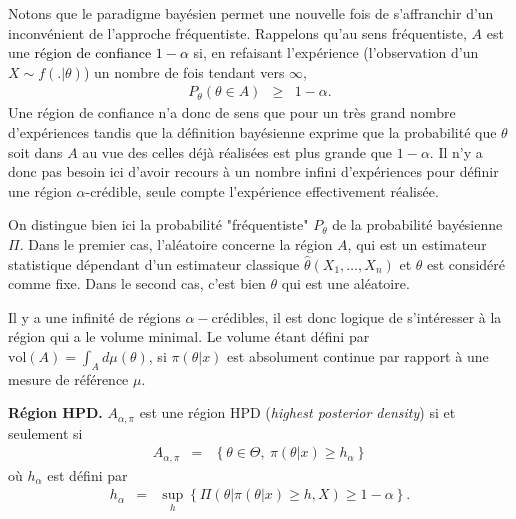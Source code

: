 Notons que le paradigme bayésien permet une nouvelle fois de s’affranchir d’un inconvénient de l’approche fréquentiste.
Rappelons qu'au sens fréquentiste, $A$ est une \textcolor{black}{région de confiance $1-\alpha$} si, en refaisant l'expérience (l'observation d'un $X\sim f(.|\theta)$) un nombre de fois tendant vers $\infty$,
\begin{eqnarray*}
P_{\theta}(\theta\in A) & \geq & 1-\alpha.
\end{eqnarray*}
Une région de confiance n’a donc de sens que pour un très grand nombre d’expériences tandis que la définition bayésienne exprime que la probabilité que $\theta$ soit dans $A$ au vue des celles déjà réalisées est plus grande que $1-\alpha$. Il n’y a donc pas besoin ici d’avoir recours à un nombre infini d’expériences pour définir une région $\alpha$-crédible, seule compte l’expérience effectivement réalisée. \\
 
 



\begin{remark}
On distingue bien ici la probabilité "fréquentiste" $P_{\theta}$ de la probabilité bayésienne $\Pi$. Dans le premier cas, l'aléatoire concerne la région $A$, qui est un estimateur statistique dépendant d'un estimateur classique $\hat\theta(X_1,\ldots,X_n)$ et $\theta$ est considéré comme fixe. Dans le second cas, c'est bien $\theta$ qui est une aléatoire.
\end{remark}

Il y a une infinité de régions $\alpha-$crédibles, il est donc logique de s’intéresser
à la région qui a le volume minimal. Le volume étant défini par $\mbox{vol}(A) = \int_A d\mu(\theta)$, si $\pi(\theta|x)$ est absolument continue par rapport à une mesure de 
référence $\mu$.

\begin{definition}{\bf Région HPD.}
$A_{\alpha,\pi}$ est une région HPD (\textit{highest posterior density}) si et seulement si 
\begin{eqnarray*}
A_{\alpha,\pi} & = & \left\{\theta\in\Theta, \  \pi(\theta|x)\geq h_{\alpha}\right\}
\end{eqnarray*}
où $h_{\alpha}$ est défini par 
\begin{eqnarray*}
h_{\alpha} &  = & \sup_h\left\{ \Pi\left(\theta | \pi(\theta|x)\geq h, X\right) \geq 1-{\alpha}\right\}.
\end{eqnarray*}
\end{definition}

